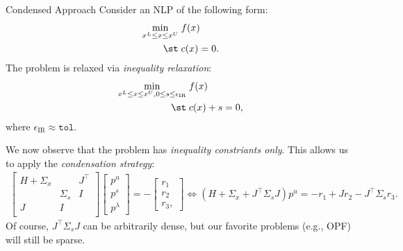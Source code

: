 \begin{frame}{Condensed Approach}
  Consider an NLP of the following form: 
  \begin{align*}
    \mathop{\text{min}}_{x^L\leq x\leq x^U}\;& f(x)\;\\
    \st\;&c(x) = 0.
  \end{align*}
  The problem is relaxed via {\it inequality relaxation}:
  \begin{align*}
    \mathop{\text{min}}_{x^L\leq x\leq x^U, 0\leq s \leq \epsilon_{\text{IR}}}\;& f(x)\;\\
    \st\;& c(x) + s= 0,
  \end{align*}
  where $\epsilon_{\text{IR}}\approx\texttt{tol}$.

  We now observe that the problem has {\it inequality constriants only}. This allows us to apply the {\it condensation strategy}:
  \begin{align*}
    \begin{bmatrix}
      H + \Sigma_x & &J^\top \\
      & \Sigma_s &I \\
      J & I &\\
    \end{bmatrix}
    \begin{bmatrix}
      p^u \\ p^s \\ p^\lambda
    \end{bmatrix}  = -
    \begin{bmatrix}
      r_1 \\ r_2 \\ r_3 ,
    \end{bmatrix}
    \iff \left(H + \Sigma_x+ J^\top \Sigma_s J \right) p^u = -r_1 + J r_2 - J^\top \Sigma_s r_3.
  \end{align*}
  Of course, $J^\top \Sigma_s J$ can be arbitrarily dense, but our favorite problems (e.g., OPF) will still be sparse.
\end{frame}

